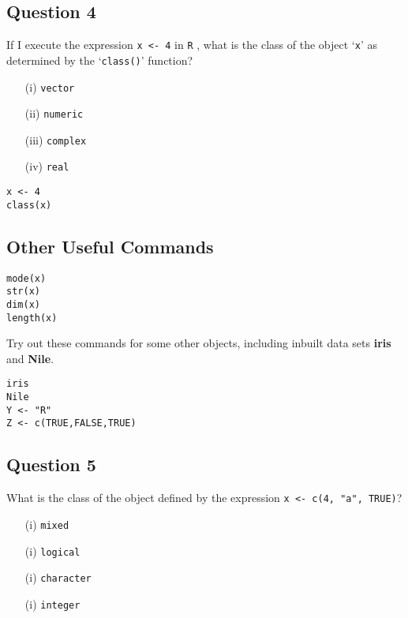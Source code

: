\documentclass[12pt]{article}
\begin{document}
\subsection*{Question 4}
\Large
If I execute the expression \texttt{x <- 4} in \texttt{R}
, what is the class of the object `\texttt{x}' as determined by the `\texttt{class()}' function?
\begin{itemize}
	\item[(i)] \texttt{vector}
	\item[(ii)] \texttt{numeric}
	\item[(iii)] \texttt{complex}
	\item[(iv)] \texttt{real}
\end{itemize}

\begin{framed}
\begin{verbatim}
x <- 4
class(x)

\end{verbatim}	
\end{framed}
\newpage
\subsection*{Other Useful Commands}
\begin{framed}
\begin{verbatim}
mode(x)
str(x)
dim(x)
length(x)
\end{verbatim}	
\end{framed}

\noindent Try out these commands for some other objects, including inbuilt data sets \textbf{iris} and \textbf{Nile}.

\begin{framed}
\begin{verbatim}
iris   
Nile
Y <- "R"
Z <- c(TRUE,FALSE,TRUE)
\end{verbatim}
\end{framed}
\newpage
\subsection*{Question 5}
\Large
What is the class of the object defined by the expression \texttt{x <- c(4, "a", TRUE)}?
\begin{itemize}
	\item[(i)] \texttt{mixed}
	\item[(i)] \texttt{logical}
	\item[(i)] \texttt{character}
	\item[(i)] \texttt{integer}
\end{itemize}
\end{document}
